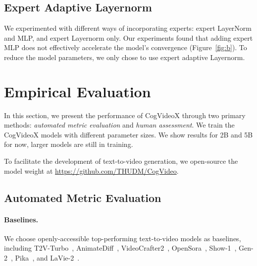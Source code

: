 \documentclass{article} \usepackage{iclr2024_conference,times}
\newcommand{\hide}[1]{}
\newcommand{\model}{CogVideoX\xspace}
\begin{document}
\subsection{Expert Adaptive Layernorm}
We experimented with different ways of incorporating experts: expert LayerNorm and MLP, and expert Layernorm only. Our experiments found that adding expert MLP does not effectively accelerate the model's convergence (Figure~\ref{fig:b}). To reduce the model parameters, we only chose to use expert adaptive Layernorm. \section{Empirical Evaluation}

In this section, we present the performance of \model through two primary methods: \textit{automated metric evaluation} and \textit{human assessment}. We train the \model models with different parameter sizes. 
We show results for 2B and 5B for now, larger models are still in training.


To facilitate the development of text-to-video generation, we open-source the model weight at \url{https://github.com/THUDM/CogVideo}.




\subsection{Automated Metric Evaluation} 

\paragraph{Baselines.} 
We choose openly-accessible top-performing text-to-video models as baselines, including T2V-Turbo~\cite{li2024t2v}, AnimateDiff~\cite{guo2023animatediff}, VideoCrafter2~\cite{chen2024videocrafter2}, OpenSora~\cite{opensora}, Show-1~\cite{zhang2023show}, Gen-2~\cite{gen2}, Pika~\cite{pika}, and LaVie-2~\cite{wang2023lavie}.




\hide{
\begin{figure}
\centering
\texttt{[image: images/bench\_eval9.png]}
\caption{The radar chart comparing the performance of different models. CogVideoX represents the largest one. It is clear that CogVideoX outperforms its competitors in the vast majority of metrics, and it is very close to the leading models in the remaining indicator.
}
\label{fig:radar}


\end{figure}

}%
 
\end{document}
